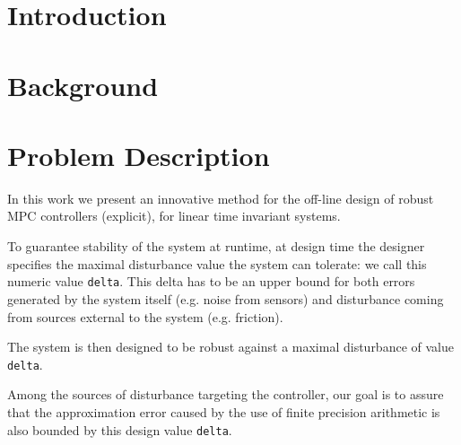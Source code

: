 \documentclass[sigconf]{acmart}
\begin{document}

%

%


\section{Introduction}
\section{Background}
\section{Problem Description}
In this work we present an innovative method for the off-line design of robust MPC controllers (explicit), for linear time invariant systems.

To guarantee stability of the system at runtime, at design time the designer specifies the maximal disturbance value the system can tolerate: we call this numeric value \texttt{delta}. This delta has to be an upper bound for both errors generated by the system itself (e.g. noise from sensors) and disturbance coming from sources external to the system (e.g. friction).

The system is then designed to be robust against a maximal disturbance of value \texttt{delta}.

Among the sources of disturbance targeting the controller, our goal is to assure that the approximation error caused by the use of finite precision arithmetic is also bounded by this design value \texttt{delta}.
\end{document}

